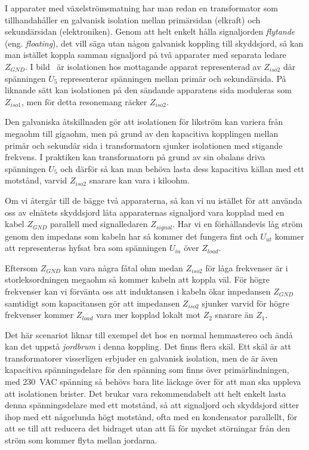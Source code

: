 \noindent
I apparater med växelströmsmatning har man redan en transformator som
tillhandahåller en galvanisk isolation mellan primärsidan (elkraft) och
sekundärsidan (elektroniken).
Genom att helt enkelt hålla signaljorden \emph{flytande} (eng.
\emph{floating}), det vill säga utan någon galvanisk koppling till skyddsjord,
så kan man istället koppla samman signaljord på två apparater med separata
ledare \(Z_{GND}\).
I bild~ är isolationen hos mottagande apparat representerad
av \(Z_{iso2}\) där spänningen \(U_5\) representerar spänningen mellan primär
och sekundärsida.
På liknande sätt kan isolationen på den sändande apparatens sida moduleras som
 \(Z_{iso1}\), men för detta resonemang räcker \(Z_{iso2}\).

Den galvaniska åtskillnaden gör att isolationen för likström kan variera från
megaohm till gigaohm, men på grund av den kapacitiva kopplingen mellan primär
och sekundär sida i transformatorn sjunker isolationen med stigande frekvens.
I praktiken kan transformatorn på grund av sin obalans driva spänningen \(U_5\)
och därför så kan man behöva lasta dess kapacitiva källan med ett motstånd,
varvid \(Z_{iso2}\) snarare kan vara i kiloohm.

Om vi återgår till de bägge två apparaterna, så kan vi nu istället för att
använda oss av elnätets skyddsjord låta apparaternas signaljord vara kopplad
med en kabel \(Z_{GND}\) parallell med signalledaren \(Z_{signal}\).
Har vi en förhållandevis låg ström genom den impedans som kabeln har så
kommer det fungera fint och \(U_{ut}\) kommer att representeras hyfsat bra som
spänningen \(U_{in}\) över \(Z_{load}\).

Eftersom \(Z_{GND}\) kan vara några fåtal ohm medan \(Z_{iso2}\) för låga
frekvenser är i storleksordningen megaohm så kommer kabeln att koppla väl.
För högre frekvenser kan vi förvänta oss att induktansen i kabeln ökar
impedansen \(Z_{GND}\) samtidigt som kapacitansen gör att impedansen
\(Z_{iso2}\) sjunker varvid för högre frekvenser kommer \(Z_{load}\) vara mer
kopplad lokalt mot \(Z_{2}\) snarare än \(Z_{1}\).

Det här scenariot liknar till exempel det hos en normal hemmastereo och ändå kan
det uppstå \emph{jordbrum} i denna koppling.
Det finns flera skäl.
Ett skäl är att transformatorer visserligen erbjuder en galvanisk isolation,
men de är även kapacitiva spänningsdelare för den spänning som finns över
primärlindningen, med 230~VAC spänning så behövs bara lite läckage över för att
man ska uppleva att isolationen brister.
Det brukar vara rekommendabelt att helt enkelt lasta denna spänningsdelare med
ett motstånd, så att signaljord och skyddsjord sitter ihop med ett någorlunda
högt motstånd, ofta med en kondensator parallellt, för att se till att reducera
det bidraget utan att få för mycket störningar från den ström som kommer flyta
mellan jordarna.


